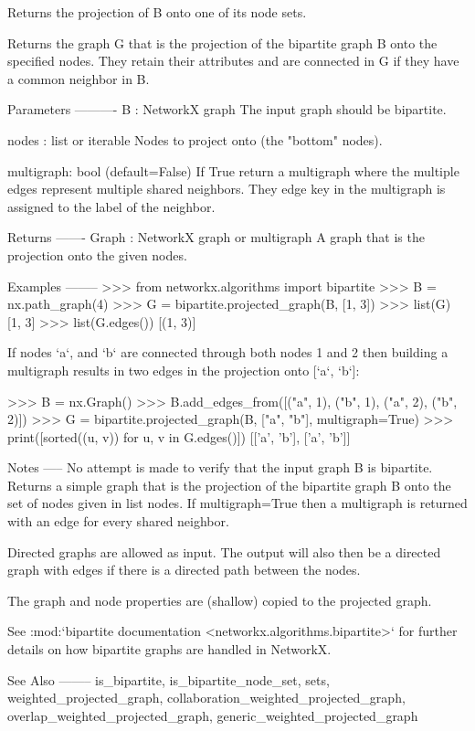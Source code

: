 \begin{DoxyVerb}Returns the projection of B onto one of its node sets.

Returns the graph G that is the projection of the bipartite graph B
onto the specified nodes. They retain their attributes and are connected
in G if they have a common neighbor in B.

Parameters
----------
B : NetworkX graph
  The input graph should be bipartite.

nodes : list or iterable
  Nodes to project onto (the "bottom" nodes).

multigraph: bool (default=False)
   If True return a multigraph where the multiple edges represent multiple
   shared neighbors.  They edge key in the multigraph is assigned to the
   label of the neighbor.

Returns
-------
Graph : NetworkX graph or multigraph
   A graph that is the projection onto the given nodes.

Examples
--------
>>> from networkx.algorithms import bipartite
>>> B = nx.path_graph(4)
>>> G = bipartite.projected_graph(B, [1, 3])
>>> list(G)
[1, 3]
>>> list(G.edges())
[(1, 3)]

If nodes `a`, and `b` are connected through both nodes 1 and 2 then
building a multigraph results in two edges in the projection onto
[`a`, `b`]:

>>> B = nx.Graph()
>>> B.add_edges_from([("a", 1), ("b", 1), ("a", 2), ("b", 2)])
>>> G = bipartite.projected_graph(B, ["a", "b"], multigraph=True)
>>> print([sorted((u, v)) for u, v in G.edges()])
[['a', 'b'], ['a', 'b']]

Notes
-----
No attempt is made to verify that the input graph B is bipartite.
Returns a simple graph that is the projection of the bipartite graph B
onto the set of nodes given in list nodes.  If multigraph=True then
a multigraph is returned with an edge for every shared neighbor.

Directed graphs are allowed as input.  The output will also then
be a directed graph with edges if there is a directed path between
the nodes.

The graph and node properties are (shallow) copied to the projected graph.

See :mod:`bipartite documentation <networkx.algorithms.bipartite>`
for further details on how bipartite graphs are handled in NetworkX.

See Also
--------
is_bipartite,
is_bipartite_node_set,
sets,
weighted_projected_graph,
collaboration_weighted_projected_graph,
overlap_weighted_projected_graph,
generic_weighted_projected_graph
\end{DoxyVerb}
 \mbox{\label{namespacenetworkx_1_1algorithms_1_1bipartite_1_1projection_a935d7b42123102da40dfab3abf214964}} 
